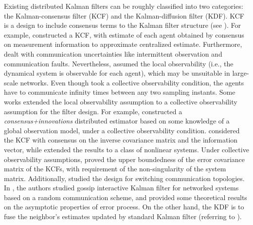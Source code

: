 \documentclass[journal,transmag]{IEEEtran}
\begin{document}
	Existing distributed Kalman filters can be roughly classified into two categories: the Kalman-consensus filter (KCF) and the Kalman-diffusion  filter (KDF).
	KCF is a design to include consensus terms to the Kalman filter structure (see \cite{olfati2009kalman,olfati2007distributed, yang2014stochastic, stankovic2009consensus, Battistelli2014Kullback,Battistelli2016stability,Battistelli2015Consensus,Dm2015Distributed,yang2017stochastic}).
	{For example, \cite{olfati2007distributed} constructed a KCF, with estimate of each agent obtained by consensus on measurement information to approximate centralized estimate. }
	Furthermore, \cite{stankovic2009consensus,yang2014stochastic} dealt with communication uncertainties like intermittent observation and communication faults.
	Nevertheless, \cite{olfati2009kalman,yang2014stochastic} assumed the local observability (i.e., the dynamical system is observable for each agent), which may be unsuitable in large-scale networks. Even though \cite{olfati2007distributed} took a collective observability condition, the agents have to communicate infinity times between any two sampling instants.   Some works extended the local observability assumption to a collective observability assumption for the filter design.   For example,
	\cite{Dm2015Distributed} constructed a \textit{consensus+innovations} distributed estimator based on some knowledge of a global observation model, under a collective observability condition.
	\cite{Battistelli2014Kullback} considered the KCF with consensus on the inverse covariance matrix and the information vector, while \cite{Battistelli2016stability} extended the results to a class of nonlinear systems.
	Under collective observability assumptions, \cite{Battistelli2014Kullback,Battistelli2016stability} proved the upper boundedness of the error covariance matrix of the KCFs, with requirement of  the non-singularity of the system matrix.
	Additionally, \cite{zhou2012distributed,zhou2013distributed} studied the design for switching communication topologies.
	{In \cite{kar2011gossip}, the authors studied gossip interactive Kalman filter for networked systems based on a random communication scheme, and provided some theoretical results on the asymptotic properties of error process.  }
	On the other hand, the KDF is to fuse the neighbor's estimates updated by standard Kalman filter (referring to \cite{cattivelli2010diffusion, Hu2012Diffusion,Wenling2015Diffusion,xiao2004fast}).
\end{document}
